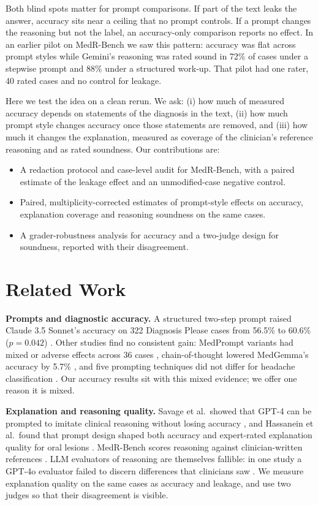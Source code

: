 \IfFileExists{IEEEtran.cls}{\ieeetrue\documentclass[conference]{IEEEtran}}{\ieeefalse\documentclass[10pt,twocolumn,letterpaper]{article}}
\begin{document}
Both blind spots matter for prompt comparisons. If part of the text leaks the answer, accuracy sits near a ceiling that no prompt controls. If a prompt changes the reasoning but not the label, an accuracy-only comparison reports no effect. In an earlier pilot on MedR-Bench we saw this pattern: accuracy was flat across prompt styles while Gemini's reasoning was rated sound in 72\% of cases under a stepwise prompt and 88\% under a structured work-up. That pilot had one rater, 40 rated cases and no control for leakage.

Here we test the idea on a clean rerun. We ask: (i) how much of measured accuracy depends on statements of the diagnosis in the text, (ii) how much prompt style changes accuracy once those statements are removed, and (iii) how much it changes the explanation, measured as coverage of the clinician's reference reasoning and as rated soundness. Our contributions are:
\begin{itemize}
\item A redaction protocol and case-level audit for MedR-Bench, with a paired estimate of the leakage effect and an unmodified-case negative control.
\item Paired, multiplicity-corrected estimates of prompt-style effects on accuracy, explanation coverage and reasoning soundness on the same cases.
\item A grader-robustness analysis for accuracy and a two-judge design for soundness, reported with their disagreement.
\end{itemize}

\section{Related Work}
\textbf{Prompts and diagnostic accuracy.} A structured two-step prompt raised Claude 3.5 Sonnet's accuracy on 322 Diagnosis Please cases from 56.5\% to 60.6\% ($p=0.042$) \cite{sonoda2025}. Other studies find no consistent gain: MedPrompt variants had mixed or adverse effects across 36 cases \cite{chai2025}, chain-of-thought lowered MedGemma's accuracy by 5.7\% \cite{sadanandan2026}, and five prompting techniques did not differ for headache classification \cite{zwanzig2026}. Our accuracy results sit with this mixed evidence; we offer one reason it is mixed.

\textbf{Explanation and reasoning quality.} Savage et al.\ showed that GPT-4 can be prompted to imitate clinical reasoning without losing accuracy \cite{savage2024}, and Hassanein et al.\ found that prompt design shaped both accuracy and expert-rated explanation quality for oral lesions \cite{hassanein2026}. MedR-Bench scores reasoning against clinician-written references \cite{qiu2025}. LLM evaluators of reasoning are themselves fallible: in one study a GPT-4o evaluator failed to discern differences that clinicians saw \cite{liu2026}. We measure explanation quality on the same cases as accuracy and leakage, and use two judges so that their disagreement is visible.
\end{document}
